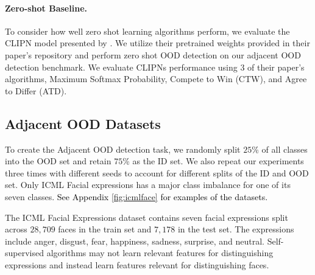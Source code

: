 \documentclass{article} %
\theoremstyle{plain}
\theoremstyle{definition}
\theoremstyle{remark}
\begin{document}
\vspace{-2mm}\paragraph{Zero-shot Baseline.}

To consider how well zero shot learning algorithms perform, we evaluate the CLIPN model presented by \citep{wang2023clipn}. We utilize their pretrained weights provided in their paper's repository and perform zero shot OOD detection on our adjacent OOD detection benchmark. We evaluate CLIPNs performance using 3 of their paper's algorithms, Maximum Softmax Probability, Compete to Win (CTW), and Agree to Differ (ATD). 





\vspace{-2mm}\subsection{Adjacent OOD Datasets}\vspace{-2mm}

To create the Adjacent OOD detection task, we randomly split $25$\% of all classes into the OOD set and retain $75$\% as the ID set. We also repeat our experiments three times with different seeds to account for different splits of the ID and OOD set. Only ICML Facial expressions has a major class imbalance for one of its seven classes. \textcolor{black}{See Appendix \ref{fig:icmlface} for examples of the datasets.}



The ICML Facial Expressions dataset \citep{icmlface} contains seven facial expressions split across $28,709$ faces in the train set and $7,178$ in the test set. The expressions include anger, disgust, fear, happiness, sadness, surprise, and neutral. Self-supervised algorithms may not learn relevant features for distinguishing expressions and instead learn features relevant for distinguishing faces.

\end{document}
